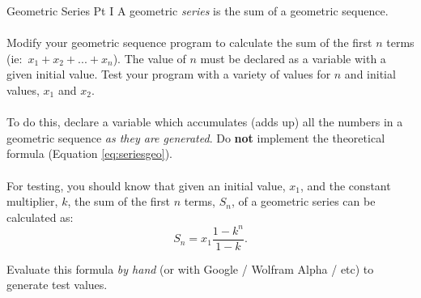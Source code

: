 \documentclass{lab}
\begin{document}
\begin{task}{Geometric Series Pt I}{}
A geometric \textit{series} is the sum of a geometric sequence.
\\ \\
Modify your geometric sequence program to calculate the sum of the first $n$ terms (ie:~$x_1+x_2+ ... + x_n$). The value of $n$ must be declared as a variable with a given initial value. Test your program with a variety of values for $n$ and initial values, $x_1$ and $x_2$.
\\ \\
To do this, declare a variable which accumulates (adds up) all the numbers in a geometric sequence \textit{as they are generated}. Do \textbf{not} implement the theoretical formula (Equation \eqref{eq:seriesgeo}).
\\ \\
For testing, you should know that given an initial value, $x_1$, and the constant multiplier, $k$, the sum of the first $n$ terms, $S_n$, of a geometric series can be calculated as:
\begin{equation}\label{eq:seriesgeo}
S_n = x_1\frac{1-k^{n}}{1-k}.
\end{equation}

Evaluate this formula \textit{by hand} (or with Google / Wolfram Alpha / etc) to generate test values.
\end{task}
\end{document}
